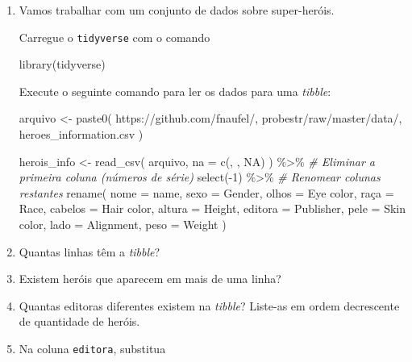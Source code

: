 \documentclass[
  11pt]{report}
\newenvironment{Shaded}{\begin{snugshade}}{\end{snugshade}}
\newcommand{\AttributeTok}[1]{\textcolor[rgb]{0.77,0.63,0.00}{#1}}
\newcommand{\CommentTok}[1]{\textcolor[rgb]{0.56,0.35,0.01}{\textit{#1}}}
\newcommand{\DecValTok}[1]{\textcolor[rgb]{0.00,0.00,0.81}{#1}}
\newcommand{\FunctionTok}[1]{\textcolor[rgb]{0.00,0.00,0.00}{#1}}
\newcommand{\NormalTok}[1]{#1}
\newcommand{\OtherTok}[1]{\textcolor[rgb]{0.56,0.35,0.01}{#1}}
\newcommand{\SpecialCharTok}[1]{\textcolor[rgb]{0.00,0.00,0.00}{#1}}
\newcommand{\StringTok}[1]{\textcolor[rgb]{0.31,0.60,0.02}{#1}}
\renewenvironment{Shaded}{
    \begin{mdframed}[%
      roundcorner=2pt,%
      innerleftmargin=5pt,%
      innerrightmargin=5pt,%
      topline=true,%
      leftline=true,%
      rightline=true,%
      bottomline=true,%
      linewidth=0.5pt,%
      linecolor=black!20,%
      backgroundcolor=black!2,%
      skipabove=2ex,%
      skipbelow=2.5ex%
    ]%
  }
  {
    \end{mdframed}
  }
\begin{document}
\begin{enumerate}
\def\labelenumi{\arabic{enumi}.}
\item
  Vamos trabalhar com um conjunto de dados sobre super-heróis.

  Carregue o \texttt{tidyverse} com o comando

\begin{Shaded}
\begin{Highlighting}[]
\FunctionTok{library}\NormalTok{(tidyverse)}
\end{Highlighting}
\end{Shaded}

  Execute o seguinte comando para ler os dados para uma \emph{tibble}:

\begin{Shaded}
\begin{Highlighting}[]
\NormalTok{arquivo }\OtherTok{\textless{}{-}} \FunctionTok{paste0}\NormalTok{(}
  \StringTok{\textquotesingle{}https://github.com/fnaufel/\textquotesingle{}}\NormalTok{,}
  \StringTok{\textquotesingle{}probestr/raw/master/data/\textquotesingle{}}\NormalTok{,}
  \StringTok{\textquotesingle{}heroes\_information.csv\textquotesingle{}}      
\NormalTok{)}

\NormalTok{herois\_info }\OtherTok{\textless{}{-}} \FunctionTok{read\_csv}\NormalTok{(}
\NormalTok{  arquivo,}
  \AttributeTok{na =} \FunctionTok{c}\NormalTok{(}\StringTok{\textquotesingle{}\textquotesingle{}}\NormalTok{, }\StringTok{\textquotesingle{}{-}\textquotesingle{}}\NormalTok{, }\StringTok{\textquotesingle{}NA\textquotesingle{}}\NormalTok{)}
\NormalTok{) }\SpecialCharTok{\%\textgreater{}\%} 
  \CommentTok{\# Eliminar a primeira coluna (números de série)}
  \FunctionTok{select}\NormalTok{(}\SpecialCharTok{{-}}\DecValTok{1}\NormalTok{) }\SpecialCharTok{\%\textgreater{}\%} 
  \CommentTok{\# Renomear colunas restantes}
  \FunctionTok{rename}\NormalTok{(}
    \AttributeTok{nome =}\NormalTok{ name,}
    \AttributeTok{sexo =}\NormalTok{ Gender,}
    \AttributeTok{olhos =} \StringTok{\textquotesingle{}Eye color\textquotesingle{}}\NormalTok{,}
\NormalTok{    raça }\OtherTok{=}\NormalTok{ Race,}
    \AttributeTok{cabelos =} \StringTok{\textquotesingle{}Hair color\textquotesingle{}}\NormalTok{,}
    \AttributeTok{altura =}\NormalTok{ Height,}
    \AttributeTok{editora =}\NormalTok{ Publisher,}
    \AttributeTok{pele =} \StringTok{\textquotesingle{}Skin color\textquotesingle{}}\NormalTok{,}
    \AttributeTok{lado =}\NormalTok{ Alignment,}
    \AttributeTok{peso =}\NormalTok{ Weight}
\NormalTok{  )}
\end{Highlighting}
\end{Shaded}
\item
  Quantas linhas têm a \emph{tibble}?
\item
  Existem heróis que aparecem em mais de uma linha?
\item
  Quantas editoras diferentes existem na \emph{tibble}? Liste-as em ordem decrescente de quantidade de heróis.
\item
  Na coluna \texttt{editora}, substitua


\end{enumerate}
\end{document}
